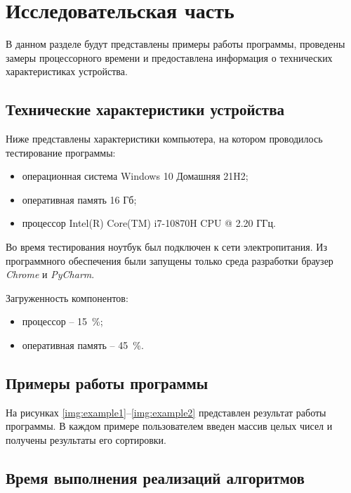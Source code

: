 \chapter{Исследовательская часть}

В данном разделе будут представлены примеры работы программы, проведены замеры процессорного времени и предоставлена информация о технических характеристиках устройства.

\section{Технические характеристики устройства}

Ниже представлены характеристики компьютера, на котором проводилось тестирование программы:

\begin{itemize}[label=---]
    \item операционная система Windows 10 Домашняя 21H2;
    \item оперативная память 16 Гб;
    \item процессор Intel(R) Core(TM) i7-10870H CPU @ 2.20 ГГц.
\end{itemize}

Во время тестирования ноутбук был подключен к сети электропитания. Из программного обеспечения были запущены только среда разработки браузер \textit{Chrome} и \textit{PyCharm}.

Загруженность компонентов:

\begin{itemize}[label=---]
    \item процессор -- 15~\%;
    \item оперативная память -- 45~\%.
\end{itemize}

\section{Примеры работы программы}

На рисунках \ref{img:example1}--\ref{img:example2} представлен результат работы программы. В каждом примере пользователем введен массив целых чисел и получены результаты его сортировки.

\clearpage


\section{Время выполнения реализаций алгоритмов}

